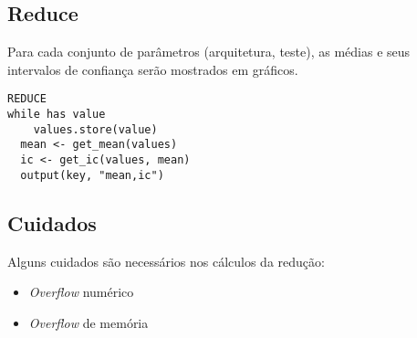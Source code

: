 \documentclass[brazil, a4paper,12pt]{article}
\begin{document}
\subsection{Reduce}
Para cada conjunto de parâmetros (arquitetura, teste), as médias e seus         intervalos de confiança serão mostrados em gráficos.

\begin{verbatim}
REDUCE
while has value
    values.store(value)
  mean <- get_mean(values)
  ic <- get_ic(values, mean)
  output(key, "mean,ic")
  \end{verbatim}

  \subsection{Cuidados}
  Alguns cuidados são necessários nos cálculos da redução:
  \begin{itemize}
  \item \emph{Overflow} numérico
  \item \emph{Overflow} de memória
  \end{itemize}

%
%
%
%
\end{document}
